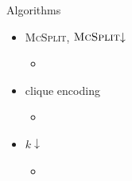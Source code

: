 \documentclass{beamer}
\begin{document}
\begin{frame}{Algorithms}
  \begin{itemize}
  \item \textsc{McSplit}, $\textsc{McSplit}{\downarrow}$
    \begin{itemize}
    \item \cite{DBLP:conf/ijcai/McCreeshPT17}
    \end{itemize}
  \item clique encoding
    \begin{itemize}
    \item \cite{DBLP:conf/cp/McCreeshNPS16}
    \end{itemize}
  \item $k{\downarrow}$
    \begin{itemize}
    \item \cite{DBLP:conf/aaai/HoffmannMR17}
    \end{itemize}
  \end{itemize}
\end{frame}
\end{document}
